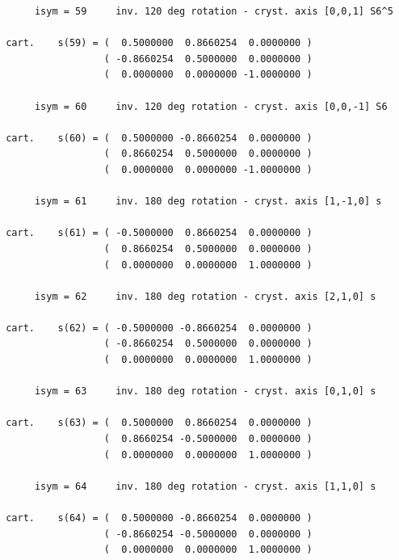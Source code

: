 \documentclass[12pt,a4paper]{article}
\begin{document}
\begin{verbatim}
      isym = 59     inv. 120 deg rotation - cryst. axis [0,0,1] S6^5

 cart.    s(59) = (  0.5000000  0.8660254  0.0000000 )
                  ( -0.8660254  0.5000000  0.0000000 )
                  (  0.0000000  0.0000000 -1.0000000 )

      isym = 60     inv. 120 deg rotation - cryst. axis [0,0,-1] S6

 cart.    s(60) = (  0.5000000 -0.8660254  0.0000000 )
                  (  0.8660254  0.5000000  0.0000000 )
                  (  0.0000000  0.0000000 -1.0000000 )

      isym = 61     inv. 180 deg rotation - cryst. axis [1,-1,0] s

 cart.    s(61) = ( -0.5000000  0.8660254  0.0000000 )
                  (  0.8660254  0.5000000  0.0000000 )
                  (  0.0000000  0.0000000  1.0000000 )

      isym = 62     inv. 180 deg rotation - cryst. axis [2,1,0] s

 cart.    s(62) = ( -0.5000000 -0.8660254  0.0000000 )
                  ( -0.8660254  0.5000000  0.0000000 )
                  (  0.0000000  0.0000000  1.0000000 )

      isym = 63     inv. 180 deg rotation - cryst. axis [0,1,0] s

 cart.    s(63) = (  0.5000000  0.8660254  0.0000000 )
                  (  0.8660254 -0.5000000  0.0000000 )
                  (  0.0000000  0.0000000  1.0000000 )

      isym = 64     inv. 180 deg rotation - cryst. axis [1,1,0] s

 cart.    s(64) = (  0.5000000 -0.8660254  0.0000000 )
                  ( -0.8660254 -0.5000000  0.0000000 )
                  (  0.0000000  0.0000000  1.0000000 )

\end{verbatim}

\newpage
\end{document}
